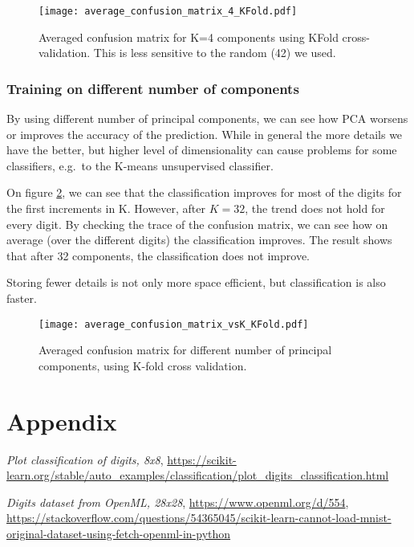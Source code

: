 \documentclass{article}
\begin{document}
\begin{figure}[h!]
    \centering
    \texttt{[image: average\_confusion\_matrix\_4\_KFold.pdf]}
    \caption{Averaged confusion matrix for K=4 components using KFold cross-validation.
        This is less sensitive to the random (42) we used.}
    \label{fig:confusion_matrix_4_kfold}
\end{figure}

\subsubsection{Training on different number of components}
By using different number of principal components,
we can see how PCA worsens or improves the accuracy of the prediction.
While in general the more details we have the better,
but higher level of dimensionality can cause problems for some classifiers,
e.g.\ to the K-means unsupervised classifier.

On figure \ref{fig:confusion_matrix_4_kfold_K},
we can see that the classification improves for most of the digits for the first increments in K.
However, after $K=32$, the trend does not hold for every digit.
By checking the trace of the confusion matrix, we can see how on average (over the different digits)
the classification improves.
The result shows that after 32 components, the classification does not improve.

Storing fewer details is not only more space efficient,
but classification is also faster.


\begin{figure}[h!]
    \centering
    \texttt{[image: average\_confusion\_matrix\_vsK\_KFold.pdf]}
    \caption{Averaged confusion matrix for different number of principal components,
        using K-fold cross validation.}
    \label{fig:confusion_matrix_4_kfold_K}
\end{figure}


\clearpage
\section{Appendix}

\begin{thebibliography}{9}
    \textit{Plot classification of digits, 8x8},
    \url{https://scikit-learn.org/stable/auto_examples/classification/plot_digits_classification.html}

    \textit{Digits dataset from OpenML, 28x28},
    \url{https://www.openml.org/d/554},
    \url{https://stackoverflow.com/questions/54365045/scikit-learn-cannot-load-mnist-original-dataset-using-fetch-openml-in-python}
\end{thebibliography}
\end{document}
